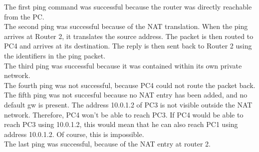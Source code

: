 
The first ping command was successful because the router was directly reachable from the PC. \\
The second ping was successful because of the NAT translation. When the ping arrives at Router 2, it translates the source address. The packet is then routed to PC4 and arrives at its destination. The reply is then sent back to Router 2 using the identifiers in the ping packet. \\
The third ping was successful because it was contained within its own private network. \\
The fourth ping was not successful, because PC4 could not route the packet back. \\
The fifth ping was not succesful because no NAT entry has been added, and no default gw is present. The address 10.0.1.2 of PC3 is not visible outside the NAT network. Therefore, PC4 won't be able to reach PC3. If PC4 would be able to reach PC3 using 10.0.1.2, this would mean that he can also reach PC1 using address 10.0.1.2. Of course, this is impossible. \\
The last ping was successful, because of the NAT entry at router 2.